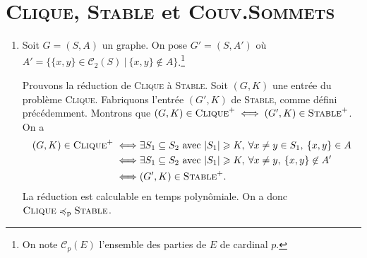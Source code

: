 \section{\textsc{Clique}, \textsc{Stable} et \textsc{Couv.Sommets}}

\begin{enumerate}
	\item Soit $G = (S, A)$\/ un graphe. On pose $G' = (S, A')$\/ où~$A' = \big\{\{x,y\} \in \mathcal{C}_2(S)\:\big|\: \{x,y\} \not\in A\big\}$.\footnote{On note $\mathcal{C}_p(E)$\/ l'ensemble des parties de $E$\/ de cardinal $p$.}

		Prouvons la réduction de \textsc{Clique} à \textsc{Stable}.
		Soit $(G, K)$\/ une entrée du problème \textsc{Clique}.
		Fabriquons l'entrée $(G', K)$\/ de \textsc{Stable}, comme défini précédemment.
		Montrons que $(G, K) \in \textsc{Clique}^+ \iff (G', K) \in \textsc{Stable}^+$.
		On a
		\begin{align*}
			(G, K) \in \textsc{Clique}^+ \iff& \exists S_1 \subseteq S_2 \text{ avec } |S_1| \ge K,\: \forall x \neq y \in S_1,\: \{x,y\} \in A\\
			\iff& \exists S_1 \subseteq S_2 \text{ avec } |S_1| \ge K,\: \forall x \neq y,\: \{x,y\} \not\in A'\\
			\iff& (G', K) \in \textsc{Stable}^+.
		\end{align*}
		La réduction est calculable en temps polynômiale. On a donc $\textsc{Clique}\preceq_\mathrm{p} \textsc{Stable}$.


\end{enumerate}
